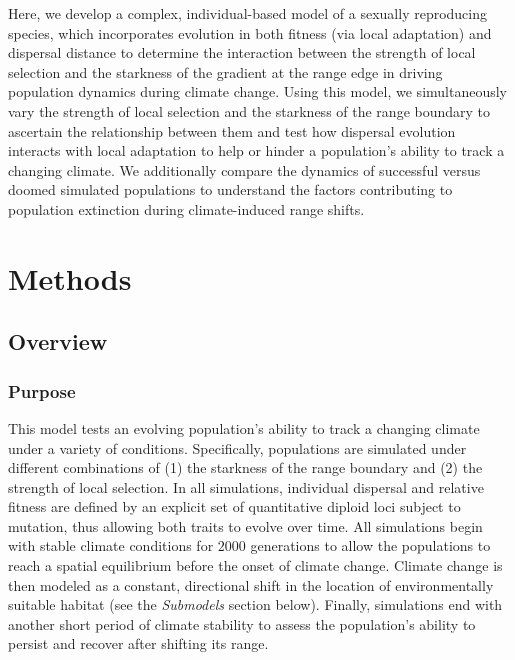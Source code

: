\documentclass[11pt, oneside]{article}
\begin{document}
Here, we develop a complex, individual-based model of a sexually reproducing species, which incorporates evolution in both fitness (via local adaptation) and dispersal distance to determine the interaction between the strength of local selection and the starkness of the gradient at the range edge in driving population dynamics during climate change. Using this model, we simultaneously vary the strength of local selection and the starkness of the range boundary to ascertain the relationship between them and test how dispersal evolution interacts with local adaptation to help or hinder a population's ability to track a changing climate. We additionally compare the dynamics of successful versus doomed simulated populations to understand the factors contributing to population extinction during climate-induced range shifts.

\section{Methods}
\subsection{Overview}
\subsubsection{Purpose}
This model tests an evolving population's ability to track a changing climate under a variety of conditions. Specifically, populations are simulated under different combinations of (1) the starkness of the range boundary and (2) the strength of local selection. In all simulations, individual dispersal and relative fitness are defined by an explicit set of quantitative diploid loci subject to mutation, thus allowing both traits to evolve over time. All simulations begin with stable climate conditions for $2000$ generations to allow the populations to reach a spatial equilibrium before the onset of climate change. Climate change is then modeled as a constant, directional shift in the location of environmentally suitable habitat (see the \textit{Submodels} section below). Finally, simulations end with another short period of climate stability to assess the population's ability to persist and recover after shifting its range.
\end{document}
